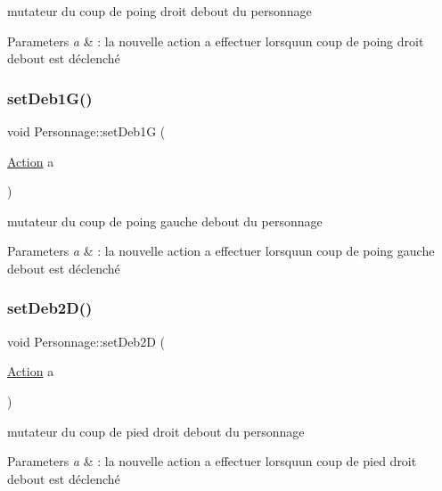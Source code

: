 mutateur du coup de poing droit debout du personnage 


\begin{DoxyParams}{Parameters}
{\em a} & \+: la nouvelle action a effectuer lorsqu\textquotesingle{}un coup de poing droit debout est déclenché \\
\hline
\end{DoxyParams}
\mbox{\label{class_personnage_ac320cfe9ec1e62e354bfe44567c11a3b}} 
\subsubsection{\texorpdfstring{set\+Deb1\+G()}{setDeb1G()}}
{\footnotesize\ttfamily void Personnage\+::set\+Deb1G (\begin{DoxyParamCaption}\item[{\hyperlink{class_action}{Action}}]{a }\end{DoxyParamCaption})}



mutateur du coup de poing gauche debout du personnage 


\begin{DoxyParams}{Parameters}
{\em a} & \+: la nouvelle action a effectuer lorsqu\textquotesingle{}un coup de poing gauche debout est déclenché \\
\hline
\end{DoxyParams}
\mbox{\label{class_personnage_aa09f382676ca2832b24ff3ce13722f9f}} 
\subsubsection{\texorpdfstring{set\+Deb2\+D()}{setDeb2D()}}
{\footnotesize\ttfamily void Personnage\+::set\+Deb2D (\begin{DoxyParamCaption}\item[{\hyperlink{class_action}{Action}}]{a }\end{DoxyParamCaption})}



mutateur du coup de pied droit debout du personnage 


\begin{DoxyParams}{Parameters}
{\em a} & \+: la nouvelle action a effectuer lorsqu\textquotesingle{}un coup de pied droit debout est déclenché \\
\hline
\end{DoxyParams}
\mbox{\label{class_personnage_a7afc1062fc4ebbe529d66e0b0a8d5e84}} 
